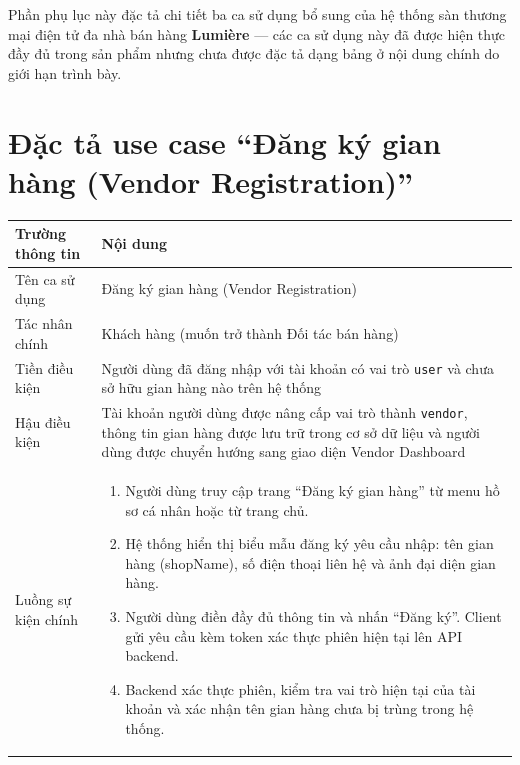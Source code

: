 \documentclass[../DoAn.tex]{subfiles}
\begin{document}
Phần phụ lục này đặc tả chi tiết ba ca sử dụng bổ sung của hệ thống sàn thương mại điện tử đa nhà bán hàng \textbf{Lumière} — các ca sử dụng này đã được hiện thực đầy đủ trong sản phẩm nhưng chưa được đặc tả dạng bảng ở nội dung chính do giới hạn trình bày.

\section{Đặc tả use case ``Đăng ký gian hàng (Vendor Registration)''}

\renewcommand{\arraystretch}{1.4}
\label{table:ucB1_vendor_reg}
\noindent\begin{tabular}{|>{\columncolor{blue!6}\raggedright\arraybackslash}p{3.5cm}|>{\raggedright\arraybackslash}p{10.5cm}|}
\hline
\rowcolor{blue!18}
\textbf{Trường thông tin} & \textbf{Nội dung} \\
\hline
Tên ca sử dụng & Đăng ký gian hàng (Vendor Registration) \\
\hline
Tác nhân chính & Khách hàng (muốn trở thành Đối tác bán hàng) \\
\hline
Tiền điều kiện & Người dùng đã đăng nhập với tài khoản có vai trò \texttt{user} và chưa sở hữu gian hàng nào trên hệ thống \\
\hline
Hậu điều kiện & Tài khoản người dùng được nâng cấp vai trò thành \texttt{vendor}, thông tin gian hàng được lưu trữ trong cơ sở dữ liệu và người dùng được chuyển hướng sang giao diện Vendor Dashboard \\
\hline
Luồng sự kiện chính &
\begin{minipage}[t]{10.3cm}
\vspace{3pt}
\raggedright
\begin{enumerate}[leftmargin=1.5em, topsep=0pt, parsep=0pt, itemsep=2pt, partopsep=0pt]
    \item Người dùng truy cập trang ``Đăng ký gian hàng'' từ menu hồ sơ cá nhân hoặc từ trang chủ.
    \item Hệ thống hiển thị biểu mẫu đăng ký yêu cầu nhập: tên gian hàng (shopName), số điện thoại liên hệ và ảnh đại diện gian hàng.
    \item Người dùng điền đầy đủ thông tin và nhấn ``Đăng ký''. Client gửi yêu cầu kèm token xác thực phiên hiện tại lên API backend.
    \item Backend xác thực phiên, kiểm tra vai trò hiện tại của tài khoản và xác nhận tên gian hàng chưa bị trùng trong hệ thống.

\end{enumerate}
\end{minipage}
\end{tabular}
\end{document}
